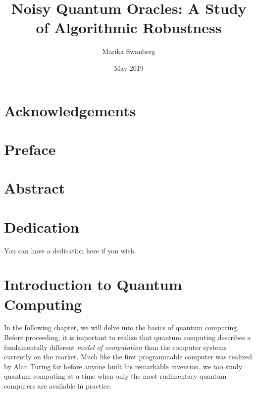 \documentclass[12pt,twoside]{reedthesis}
\title{Noisy Quantum Oracles: A Study of Algorithmic Robustness}
\author{Marika Swanberg}
\date{May 2019}
\theoremstyle{definition}
\begin{document}
  \maketitle
  \frontmatter %
  \pagestyle{empty} %

    \chapter*{Acknowledgements}

   \chapter*{Preface}

 

    \tableofcontents

    \chapter*{Abstract}
	
	\chapter*{Dedication}
	You can have a dedication here if you wish.

  \mainmatter %
  \pagestyle{fancyplain} %


	
\chapter{Introduction to Quantum Computing}


In the following chapter, we will delve into the basics of quantum computing. Before proceeding, it is important to realize that quantum computing describes a  fundamentally different \textit{model of computation} than the computer systems currently on the market. Much like the first programmable computer was realized by Alan Turing far before anyone built his remarkable invention, we too study quantum computing at a time when only the most rudimentary quantum computers are available in practice.
\end{document}
